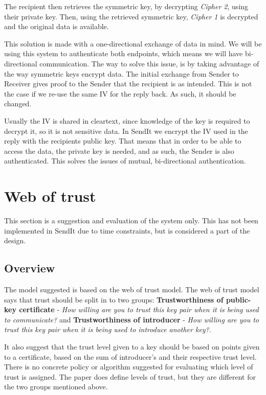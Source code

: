     The recipient then retrieves the symmetric key, by decrypting \emph{Cipher 2}, using their private key. Then, using the retrieved symmetric key, \emph{Cipher 1} is decrypted and the original data is available.

    This solution is made with a one-directional exchange of data in mind. We will be using this system to authenticate both endpoints, which means we will have bi-directional communication. The way to solve this issue, is by taking advantage of the way symmetric keys encrypt data. The initial exchange from Sender to Receiver gives proof to the Sender that the recipient is as intended. This is not the case if we re-use the same IV for the reply back. As such, it should be changed.

    Usually the IV is shared in cleartext, since knowledge of the key is required to decrypt it, so it is not sensitive data. In SendIt we encrypt the IV used in the reply with the recipients public key. That means that in order to be able to access the data, the private key is needed, and as such, the Sender is also authenticated. This solves the issues of mutual, bi-directional authentication.

%
\section{Web of trust}
\label{sec:trustmodel}
%
    This section is a suggestion and evaluation of the system only. This has not been implemented in SendIt due to time constraints, but is considered a part of the design.

    \subsection{Overview}
    The model suggested is based on the web of trust model. The web of trust model says that trust should be split in to two groups: \textbf{Trustworthiness of public-key certificate} - \emph{How willing are you to trust this key pair when it is being used to communicate?} and \textbf{Trustworthiness of introducer} - \emph{How willing are you to trust this key pair when it is being used to introduce another key?}.

    It also suggest that the trust level given to a key should be based on points given to a certificate, based on the sum of introducer's and their respective trust level. There is no concrete policy or algorithm suggested for evaluating which level of trust is assigned. The paper does define levels of trust, but they are different for the two groups mentioned above. 

